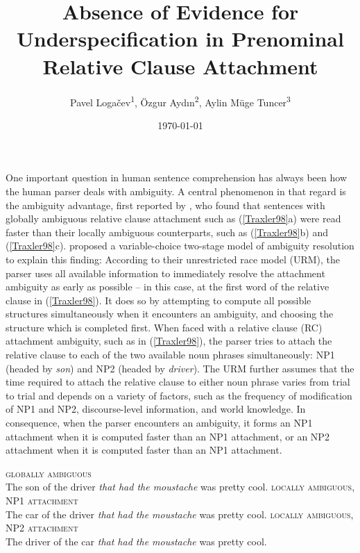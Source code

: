 \documentclass[english, doc]{apa7}\usepackage[]{graphicx}\usepackage[]{color}
\title{Absence of Evidence for Underspecification in Prenominal Relative Clause Attachment} %
\date{\today}
\author{Pavel Logačev\textsuperscript{1}, Özgur Aydın\textsuperscript{2}, Aylin Müge Tuncer\textsuperscript{3}}
\affiliation{
\vspace{0.5cm}
\textsuperscript{1} {Boğaziçi University, Istanbul, Turkey} \\
\textsuperscript{2} {Ankara University, Ankara, Turkey} \\
\textsuperscript{3} {Muğla Sıtkı Koçman University, Muğla, Turkey} }
\begin{document}
\maketitle

One important question in human sentence comprehension has always been how the human parser deals with ambiguity. A central phenomenon in that regard is the ambiguity advantage, first reported by \cite{TraxlerEtAl:1998}, who found that sentences with globally ambiguous relative clause attachment such as (\ref{Traxler98}a) were read faster than their locally ambiguous counterparts, such as (\ref{Traxler98}b) and (\ref{Traxler98}c). \cite{vanGompelEtAl:2000} proposed a variable-choice two-stage model of ambiguity resolution to explain this finding: According to their unrestricted race model (URM), the parser uses all available information to immediately resolve the attachment ambiguity as early as possible -- in this case, at the first word of the relative clause in (\ref{Traxler98}). It does so by attempting to compute all possible structures simultaneously when it encounters an ambiguity, and choosing the structure which is completed first. When faced with a relative clause (RC) attachment ambiguity, such as in (\ref{Traxler98}), the parser tries to attach the relative clause to each of the two available noun phrases simultaneously: NP1 (headed by \emph{son}) and NP2 (headed by \emph{driver}). The URM further assumes that the time required to attach the relative clause to either noun phrase varies from trial to trial and depends on a variety of factors, such as the frequency of modification of NP1 and NP2, discourse-level information, and world knowledge. In consequence, when the parser encounters an ambiguity, it forms an NP1 attachment when it is computed faster than an NP1 attachment, or an NP2 attachment when it is computed faster than an NP1 attachment.

\begin{exe}
    \ex \label{Traxler98}
      \begin{xlist}
        \ex \textsc{globally ambiguous} \\ 
            The son of the driver \textit{that had the moustache} was pretty cool.
        \ex \textsc{locally ambiguous, NP1 attachment} \\ 
             The car of the driver \textit{that had the moustache} was pretty cool.
        \ex \textsc{locally ambiguous, NP2 attachment} \\
            The driver of the car \textit{that had the moustache} was pretty cool.
        \end{xlist}
 \end{exe}
\end{document}
